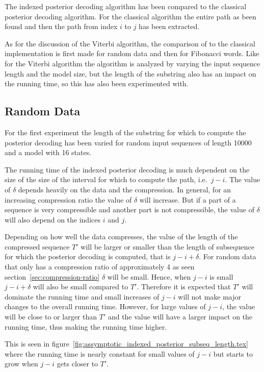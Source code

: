 The indexed posterior decoding algorithm has been compared to the classical
posterior decoding algorithm. For the classical algorithm the entire path as
been found and then the path from index $i$ to $j$ has been extracted.

As for the discussion of the Viterbi algorithm, the comparison of to the
classical implementation is first made for random data and then for Fibonacci
words. Like for the Viterbi algorithm the algorithm is analyzed by varying the
input sequence length and the model size, but the length of the substring also
has an impact on the running time, so this has also been experimented with.

\subsection{Random Data}

For the first experiment the length of the substring for which to compute the
posterior decoding has been varied for random input sequences of length 10000
and a model with 16 states.

The running time of the indexed posterior decoding is much dependent on the
size of the size of the interval for which to compute the path, i.e.\
$j-i$. The value of $\delta$ depends heavily on the data and the
compression. In general, for an increasing compression ratio the value of
$\delta$ will increase. But if a part of a sequence is very compressible and
another part is not compressible, the value of $\delta$ will also depend on the
indices $i$ and $j$.

Depending on how well the data compresses, the value of the length of the
compressed sequence $T'$ will be larger or smaller than the length of
subsequence for which the posterior decoding is computed, that is
$j - i + \delta$.  For random data that only has a compression ratio of
approximately 4 as seen section~\ref{sec:compression-ratio} $\delta$ will be
small. Hence, when $j - i$ is small $j - i + \delta$ will also be small
compared to $T'$. Therefore it is expected that $T'$ will dominate the running
time and small increases of $j - i$ will not make major changes to the overall
running time. However, for large values of $j - i$, the value will be close to
or larger than $T'$ and the value will have a larger impact on the running
time, thus making the running time higher.

This is seen in
figure~\ref{fig:assymptotic_indexed_posterior_subseq_length.tex} where the
running time is nearly constant for small values of $j - i$ but starts to grow
when $j - i$ gets closer to $T'$.

